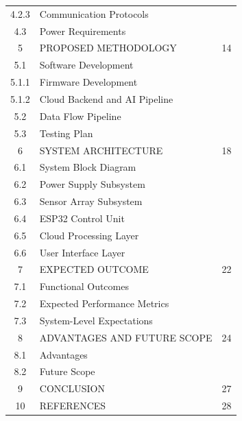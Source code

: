 \begin{longtable}{|c|p{9cm}|c|}
4.2.3 & \qquad Communication Protocols & \\
4.3 & \quad Power Requirements & \\
\hline
5 & PROPOSED METHODOLOGY & 14 \\
5.1 & \quad Software Development & \\
5.1.1 & \qquad Firmware Development & \\
5.1.2 & \qquad Cloud Backend and AI Pipeline & \\
5.2 & \quad Data Flow Pipeline & \\
5.3 & \quad Testing Plan & \\
\hline
6 & SYSTEM ARCHITECTURE & 18 \\
6.1 & \quad System Block Diagram & \\
6.2 & \quad Power Supply Subsystem & \\
6.3 & \quad Sensor Array Subsystem & \\
6.4 & \quad ESP32 Control Unit & \\
6.5 & \quad Cloud Processing Layer & \\
6.6 & \quad User Interface Layer & \\
\hline
7 & EXPECTED OUTCOME & 22 \\
7.1 & \quad Functional Outcomes & \\
7.2 & \quad Expected Performance Metrics & \\
7.3 & \quad System-Level Expectations & \\
\hline
8 & ADVANTAGES AND FUTURE SCOPE & 24 \\
8.1 & \quad Advantages & \\
8.2 & \quad Future Scope & \\
\hline
9 & CONCLUSION & 27 \\
\hline
10 & REFERENCES & 28 \\
\hline
\end{longtable}
\newpage
